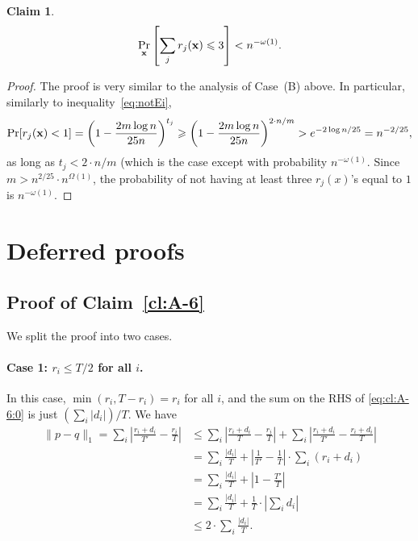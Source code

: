 \documentclass[10pt,a4paper]{article}
\newtheorem{claim}[thm]{Claim}
\newcommand\norm[1]{\| #1 \|}
\renewcommand\geq{\geqslant}
\renewcommand\leq{\leqslant}
\renewcommand\le{\leqslant}
\begin{document}
\begin{claim}\label{cl:A-7}
\begin{equation}
\Pr_{{\bf x}} \left[\sum_j r_j({\bf x}) \le 3\right] < n^{-\omega(1)}.
\end{equation}
\end{claim}

\begin{proof}
	The proof is very similar to the analysis of Case~(B) above. In particular, similarly to inequality~\eqref{eq:notEi},
	$$
	\Pr[r_j({\bf x})<1] = \left( 1-\frac{2m \log n}{25 n} \right)^{t_j}
    \geq
	\left( 1-\frac{2m \log n}{25 n} \right)^{2 \cdot n/m} > e^{-2 \log n/25} = n^{-2/25},
	$$
	as long as $t_j < 2\cdot n/m$ (which is the case except with probability $n^{-\omega(1)}$. Since $m > n^{2/25} \cdot n^{\Omega(1)}$, the probability of not having at least three $r_j(x)$'s equal to $1$ is $n^{-\omega(1)}$.
\end{proof}

\setcounter{thm}{57}\appendix
\section{Deferred proofs}\label{sec:def_proofs}
\subsection{Proof of Claim~\ref{cl:A-6}}
We split the proof into two cases.
	\paragraph{Case 1: $r_i \le T/2$ for all $i$.} In this case,
	$\min(r_i, T-r_i)=r_i$ for all $i$, and the sum on the RHS of \eqref{eq:cl:A-6:0} is just $(\sum_i |d_i|)/T$. We have
	\begin{align*}
	\norm{p-q}_1 = \sum_i \left| \frac{r_i+d_i}{T'} - \frac{r_i}{T} \right|
    &\le
	\sum_i \left| \frac{r_i+d_i}{T} - \frac{r_i}{T} \right| +
	\sum_i \left| \frac{r_i+d_i}{T'} - \frac{r_i+d_i}{T} \right| \\
	&=\sum_i \frac{|d_i|}{T} + \left|\frac{1}{T'}-\frac{1}{T}\right|\cdot
	\sum_i (r_i+d_i)\\
    &= \sum_i \frac{|d_i|}{T}  + \left|1-\frac{T'}{T}\right|\\
    &=\sum_i \frac{|d_i|}{T} +\frac{1}{T} \cdot \left| \sum_i d_i \right| \\
	&\leq 2\cdot \sum_i \frac{|d_i|}{T}.
	\end{align*}
	
\end{document}
